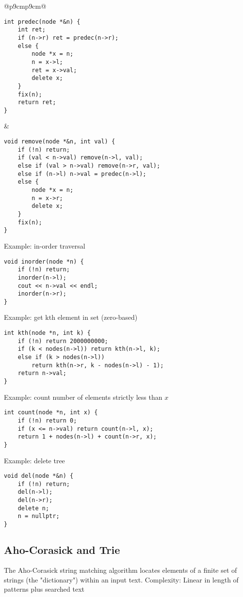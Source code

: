 \documentclass[letterpaper]{article}
\begin{document}
\begin{tabular}{@{}p{9cm}p{9cm}@{}}
\begin{lstlisting}
int predec(node *&n) {
	int ret;
	if (n->r) ret = predec(n->r);
	else {
		node *x = n;
		n = x->l;
		ret = x->val;
		delete x;
	}
	fix(n);
	return ret;
}
\end{lstlisting}
     &
    \begin{lstlisting}
void remove(node *&n, int val) {
	if (!n) return;
	if (val < n->val) remove(n->l, val);
	else if (val > n->val) remove(n->r, val);
	else if (n->l) n->val = predec(n->l);
	else {
		node *x = n;
		n = x->r;
		delete x;
	}
	fix(n);
}
\end{lstlisting}
    Example: in-order traversal
    \begin{lstlisting}
void inorder(node *n) {
	if (!n) return;
	inorder(n->l);
	cout << n->val << endl;
	inorder(n->r);
}
\end{lstlisting}
    Example: get kth element in set (zero-based)
    \begin{lstlisting}
int kth(node *n, int k) {
	if (!n) return 2000000000;
	if (k < nodes(n->l)) return kth(n->l, k);
	else if (k > nodes(n->l))
		return kth(n->r, k - nodes(n->l) - 1);
	return n->val;
}
\end{lstlisting}
    Example: count number of elements strictly less than $x$
    \begin{lstlisting}
int count(node *n, int x) {
	if (!n) return 0;
	if (x <= n->val) return count(n->l, x);
	return 1 + nodes(n->l) + count(n->r, x);
}
\end{lstlisting}
    Example: delete tree
    \begin{lstlisting}
void del(node *&n) {
	if (!n) return;
	del(n->l);
	del(n->r);
	delete n;
	n = nullptr;
}
\end{lstlisting}
\end{tabular}

\subsection{Aho-Corasick and Trie}

The Aho-Corasick string matching algorithm locates elements of a finite set of strings (the "dictionary") within an input text. Complexity: Linear in length of patterns plus searched text
\end{document}
